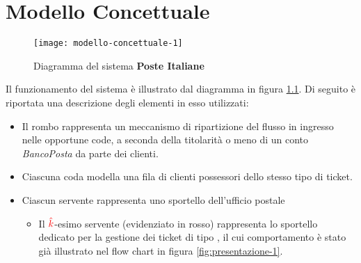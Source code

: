 \chapter{Modello Concettuale}\label{chp:modello-concettuale}
\begin{figure}[ht]
\centering
\texttt{[image: modello-concettuale-1]}
\caption{Diagramma del sistema \textbf{Poste Italiane}}
\label{fig:modello-concettuale-1}
\end{figure}

Il funzionamento del sistema è illustrato dal diagramma in figura \ref{fig:modello-concettuale-1}. Di seguito è riportata una descrizione degli elementi in esso utilizzati:
\begin{itemize}
\item Il rombo rappresenta un meccanismo di ripartizione del flusso in ingresso nelle opportune code, a seconda della titolarità o meno di un conto \textsl{BancoPosta} da parte dei clienti.
\item Ciascuna coda modella una fila di clienti possessori dello stesso tipo di ticket.
\item Ciascun servente rappresenta uno sportello dell'ufficio postale
\begin{itemize}
\item Il ${\color{red}\hat{k}}$-esimo servente (evidenziato in {\color{red} rosso}) rappresenta lo sportello dedicato per la gestione dei ticket di tipo \sr{}, il cui comportamento è stato già illustrato nel flow chart in figura \ref{fig:presentazione-1}.
\end{itemize}
\end{itemize}

